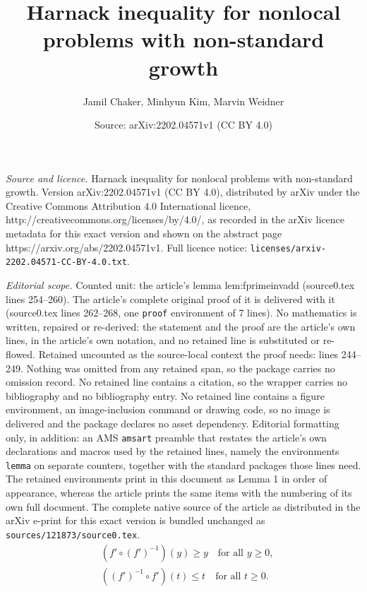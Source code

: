 \documentclass[10pt,a4paper]{amsart}
\title{Harnack inequality for nonlocal problems with non-standard growth}
\author{Jamil Chaker, Minhyun Kim, Marvin Weidner}
\date{Source: arXiv:2202.04571v1 (CC BY 4.0)}
\begin{document}
\maketitle

\noindent\emph{Source and licence.} Harnack inequality for nonlocal problems with non-standard growth. Version arXiv:2202.04571v1 (CC BY 4.0), distributed by arXiv under the Creative Commons Attribution 4.0 International licence, http://creativecommons.org/licenses/by/4.0/, as recorded in the arXiv licence metadata for this exact version and shown on the abstract page https://arxiv.org/abs/2202.04571v1. Full licence notice: \texttt{licenses/arxiv-2202.04571-CC-BY-4.0.txt}.\par\smallskip

\noindent\textit{Editorial scope.} Counted unit: the article's lemma lem:fprimeinvadd (source0.tex lines 254--260). The article's complete original proof of it is delivered with it (source0.tex lines 262--268, one \texttt{proof} environment of 7 lines). No mathematics is written, repaired or re-derived: the statement and the proof are the article's own lines, in the article's own notation, and no retained line is substituted or re-flowed.  Retained uncounted as the source-local context the proof needs: lines 244--249.  Nothing was omitted from any retained span, so the package carries no omission record.  No retained line contains a citation, so the wrapper carries no bibliography and no bibliography entry.  No retained line contains a figure environment, an image-inclusion command or drawing code, so no image is delivered and the package declares no asset dependency.  Editorial formatting only, in addition: an AMS \texttt{amsart} preamble that restates the article's own declarations and macros used by the retained lines, namely the environments \texttt{lemma} on separate counters, together with the standard packages those lines need.  The retained environments print in this document as Lemma 1 in order of appearance, whereas the article prints the same items with the numbering of its own full document.  The complete native source of the article as distributed in the arXiv e-print for this exact version is bundled unchanged as \texttt{sources/121873/source0.tex}.
\begin{align}
\label{eq:f-finv}
&(f' \circ (f')^{-1})(y) \geq y \quad \text{for all } y \geq 0,\\
\label{eq:finv-f}
&((f')^{-1} \circ f')(t) \leq t \quad \text{for all } t \geq 0.
\end{align}
\end{document}
